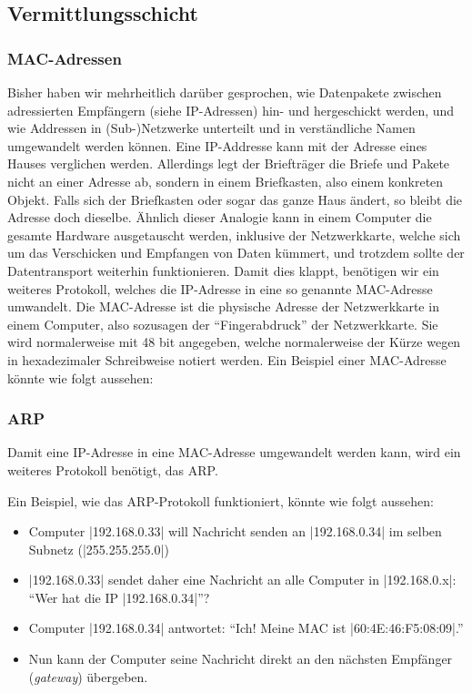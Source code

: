\subsection{Vermittlungsschicht}
\subsubsection{MAC-Adressen}
Bisher haben wir mehrheitlich darüber gesprochen, wie Datenpakete zwischen adressierten Empfängern (siehe \gls{IP}-Adressen) hin- und hergeschickt werden, und wie Addressen in (Sub-)Netzwerke unterteilt und in verständliche Namen umgewandelt werden können. Eine \gls{IP}-Addresse kann mit der Adresse eines Hauses verglichen werden. Allerdings legt der Briefträger die Briefe und Pakete nicht an einer Adresse ab, sondern in einem Briefkasten, also einem konkreten Objekt. Falls sich der Briefkasten oder sogar das ganze Haus ändert, so bleibt die Adresse doch dieselbe. Ähnlich dieser Analogie kann in einem Computer die gesamte Hardware ausgetauscht werden, inklusive der Netzwerkkarte, welche sich um das Verschicken und Empfangen von Daten kümmert, und trotzdem sollte der Datentransport weiterhin funktionieren. Damit dies klappt, benötigen wir ein weiteres Protokoll, welches die \gls{IP}-Adresse in eine so genannte \gls{MAC}-Adresse umwandelt. Die \gls{MAC}-Adresse ist die physische Adresse der Netzwerkkarte in einem Computer, also sozusagen der ``Fingerabdruck'' der Netzwerkkarte. Sie wird normalerweise mit 48 bit angegeben, welche normalerweise der Kürze wegen in hexadezimaler Schreibweise notiert werden. Ein Beispiel einer \gls{MAC}-Adresse könnte wie folgt aussehen: 

\subsubsection{ARP}
Damit eine \gls{IP}-Adresse in eine \gls{MAC}-Adresse umgewandelt werden kann, wird ein weiteres Protokoll benötigt, das \gls{ARP}.

Ein Beispiel, wie das \gls{ARP}-Protokoll funktioniert, könnte wie folgt aussehen:
\begin{itemize}
	\item Computer \commandbox|192.168.0.33| will Nachricht senden an \commandbox|192.168.0.34| im selben Subnetz (\commandBluebox|255.255.255.0|)
	\item \commandbox|192.168.0.33| sendet daher eine Nachricht an alle Computer in \commandbox|192.168.0.x|: ``Wer hat die IP \commandbox|192.168.0.34|''?
	\item Computer \commandbox|192.168.0.34| antwortet: ``Ich! Meine MAC ist \commandbox|60:4E:46:F5:08:09|.''
	\item Nun kann der Computer seine Nachricht direkt an den nächsten Empfänger (\textit{gateway}) übergeben.
\end{itemize}

